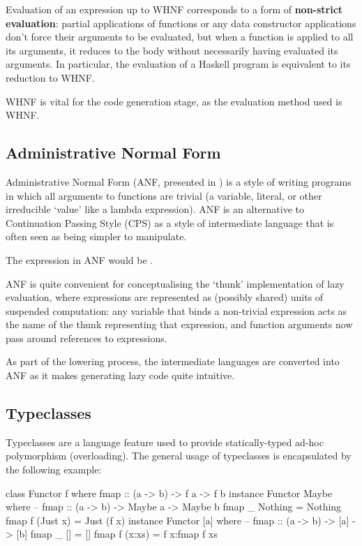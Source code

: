 \documentclass[dissertation.tex]{subfiles}
\begin{document}
{{        Evaluation of an expression up to WHNF corresponds to a form of \textbf{non-strict evaluation}: partial applications of functions or any data constructor applications don't force their arguments to be evaluated, but when a function is applied to all its arguments, it reduces to the body without necessarily having evaluated its arguments. In particular, the evaluation of a Haskell program is equivalent to its reduction to WHNF.
        
        WHNF is vital for the code generation stage, as the evaluation method used is WHNF.
    }
    \subsection{Administrative Normal Form}\label{sec:anf}
    {
        Administrative Normal Form (ANF, presented in \cite{ANF}) is a style of writing programs in which all arguments to functions are trivial (a variable, literal, or other irreducible `value' like a lambda expression). ANF is an alternative to Continuation Passing Style (CPS) as a style of intermediate language that is often seen as being simpler to manipulate.

        The expression  in ANF would be .

        ANF is quite convenient for conceptualising the `thunk' implementation of lazy evaluation, where expressions are represented as (possibly shared) units of suspended computation: any variable that binds a non-trivial expression acts as the name of the thunk representing that expression, and function arguments now pass around references to expressions. 

        As part of the lowering process, the intermediate languages are converted into ANF as it makes generating lazy code quite intuitive. 
    }
    \subsection{Typeclasses}\label{sec:typeclasses}
    {
        Typeclasses are a language feature used to provide statically-typed ad-hoc polymorphism (overloading). The general usage of typeclasses is encapsulated by the following example: 

        \begin{haskellfigure}
        class Functor f where
            fmap :: (a -> b) -> f a -> f b
        instance Functor Maybe where
            -- fmap :: (a -> b) -> Maybe a -> Maybe b
            fmap _ Nothing = Nothing
            fmap f (Just x) = Just (f x)
        instance Functor [a] where
            -- fmap :: (a -> b) -> [a] -> [b]
            fmap _ [] = []
            fmap f (x:xs) = f x:fmap f xs
        \end{haskellfigure}

}}
\end{document}
